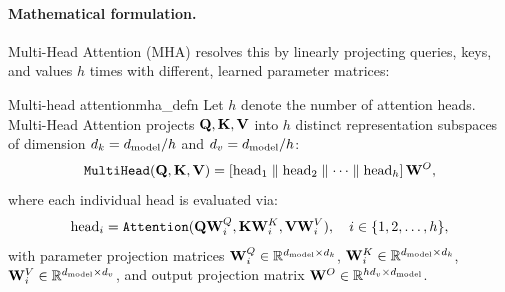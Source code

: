 \documentclass[../../main.tex]{subfiles}
\begin{document}
\paragraph{Mathematical formulation.}
Multi-Head Attention (MHA) resolves this by linearly projecting queries, keys, and values $h$ times with different, learned parameter matrices:
\begin{definition}{Multi-head attention}{mha_defn}
Let $h$ denote the number of attention heads. Multi-Head Attention projects $\mathbf{Q}, \mathbf{K}, \mathbf{V}$ into $h$ distinct representation subspaces of dimension $d_k = d_{\text{model}} / h$ and $d_v = d_{\text{model}} / h$:
\begin{equation}
\label{eq:mha_formula}
\text{\texttt{MultiHead}}(\mathbf{Q}, \mathbf{K}, \mathbf{V}) = \left[ \text{head}_1 \parallel \text{head}_2 \parallel \dots \parallel \text{head}_h \right] \mathbf{W}^O,
\end{equation}
where each individual head is evaluated via:
\begin{equation}
\text{head}_i = \text{\texttt{Attention}}(\mathbf{Q} \mathbf{W}_i^Q, \mathbf{K} \mathbf{W}_i^K, \mathbf{V} \mathbf{W}_i^V), \quad i \in \{1, 2, \dots, h\},
\end{equation}
with parameter projection matrices $\mathbf{W}_i^Q \in \mathbb{R}^{d_{\text{model}} \times d_k}$, $\mathbf{W}_i^K \in \mathbb{R}^{d_{\text{model}} \times d_k}$, $\mathbf{W}_i^V \in \mathbb{R}^{d_{\text{model}} \times d_v}$, and output projection matrix $\mathbf{W}^O \in \mathbb{R}^{h d_v \times d_{\text{model}}}$.
\end{definition}
\end{document}
